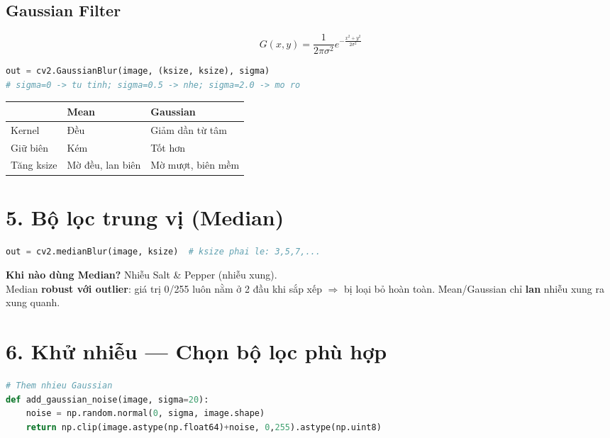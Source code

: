 \documentclass[9pt,landscape,a4paper]{extarticle}
\begin{document}
\begin{multicols*}{3}
\begin{multicols*}{3}
\begin{multicols}{3}
\subsection{Gaussian Filter}
\[
  G(x,y) = \frac{1}{2\pi\sigma^2} e^{-\frac{x^2+y^2}{2\sigma^2}}
\]
\begin{lstlisting}[language=Python]
out = cv2.GaussianBlur(image, (ksize, ksize), sigma)
# sigma=0 -> tu tinh; sigma=0.5 -> nhe; sigma=2.0 -> mo ro
\end{lstlisting}

\begin{center}\small
\begin{tabular}{@{}lll@{}}
\toprule
 & Mean & Gaussian \\
\midrule
Kernel & Đều & Giảm dần từ tâm \\
Giữ biên & Kém & Tốt hơn \\
Tăng ksize & Mờ đều, lan biên & Mờ mượt, biên mềm \\
\bottomrule
\end{tabular}
\end{center}

\section{5. Bộ lọc trung vị (Median)}

\begin{lstlisting}[language=Python]
out = cv2.medianBlur(image, ksize)  # ksize phai le: 3,5,7,...
\end{lstlisting}

\begin{tipbox}
\textbf{Khi nào dùng Median?} Nhiễu Salt \& Pepper (nhiễu xung).\\
Median \textbf{robust với outlier}: giá trị 0/255 luôn nằm ở 2 đầu khi sắp xếp $\Rightarrow$ bị loại bỏ hoàn toàn. Mean/Gaussian chỉ \textbf{lan} nhiễu xung ra xung quanh.
\end{tipbox}

\section{6. Khử nhiễu --- Chọn bộ lọc phù hợp}

\begin{lstlisting}[language=Python]
# Them nhieu Gaussian
def add_gaussian_noise(image, sigma=20):
    noise = np.random.normal(0, sigma, image.shape)
    return np.clip(image.astype(np.float64)+noise, 0,255).astype(np.uint8)


\end{lstlisting}
\end{multicols}
\end{multicols*}
\end{multicols*}
\end{document}
